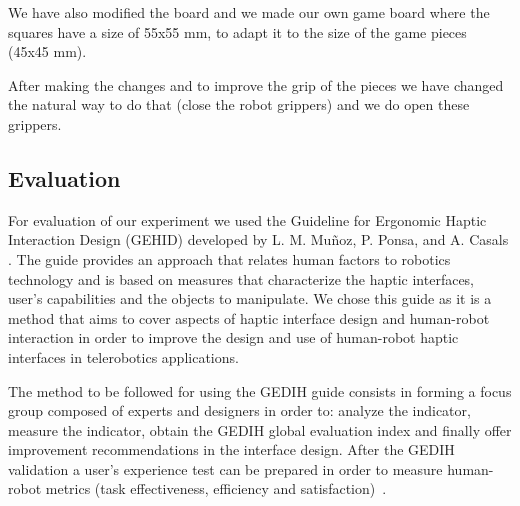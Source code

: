 \documentclass[journal,twoside]{JoPhA}
\begin{document}
We have also modified the board and we made our own game board where the squares have a size of 55x55 mm, to adapt it to the size of the game pieces (45x45 mm).

After making the changes and to improve the grip of the pieces we have changed the natural way to do that (close the robot grippers) and we do open these grippers.

\subsection{Evaluation}

For evaluation of our experiment we used the Guideline for Ergonomic Haptic Interaction Design (GEHID) developed by L. M. Muñoz, P. Ponsa, and A. Casals \cite{Munoz12}. The guide provides an approach that relates human factors to robotics technology and is based on measures that characterize the haptic interfaces, user’s capabilities and the objects to manipulate. We chose this guide as it is a method that aims to cover aspects of haptic interface design and human-robot interaction in order to improve the design and use of human-robot haptic interfaces in telerobotics applications.

The method to be followed for using the GEDIH guide consists in forming a focus group composed of experts and designers in order to: analyze the indicator, measure the indicator, obtain the GEDIH global evaluation index and finally offer improvement recommendations in the interface design. After the GEDIH validation a user’s experience test can be prepared in order to measure human-robot metrics (task effectiveness, efficiency and satisfaction)~\cite{Andonovski10}.
\end{document}
